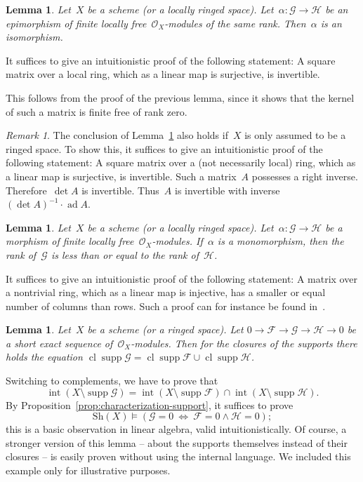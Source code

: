 \documentclass[10pt,reqno,a4paper]{amsbook}
\makeatletter
\theoremstyle{definition}
\theoremstyle{plain}
\newtheorem{lemma}[defn]{Lemma}
\theoremstyle{remark}
\newtheorem{rem}[defn]{Remark}
\newcommand{\F}{\mathcal{F}}
\renewcommand{\G}{\mathcal{G}}
\renewcommand{\H}{\mathcal{H}}
\renewcommand{\O}{\mathcal{O}}
\newcommand{\Sh}{\mathrm{Sh}}
\DeclareMathOperator{\Int}{int}
\DeclareMathOperator{\Clos}{cl}
\DeclareMathOperator{\supp}{supp}
\newcommand{\?}{\,{:}\,}
\renewcommand{\_}{\mathpunct{.}\,}
\renewenvironment{proof}[1][\proofname]{\par
  \pushQED{\qed}%
  \normalfont \topsep6\p@\@plus6\p@\relax
  \trivlist
  \item[\hskip\labelsep
        \itshape
    #1\@addpunct{.}]\ignorespaces
}{%
  \popQED\endtrivlist\@endpefalse
}
\makeatother
\begin{document}
\begin{lemma}\label{lemma:epi-iso}Let~$X$ be a scheme (or a locally ringed space). Let~$\alpha : \G
\to \H$ be an epimorphism of finite locally free~$\O_X$-modules of the same
rank. Then~$\alpha$ is an isomorphism.\end{lemma}
\begin{proof}It suffices to give an intuitionistic proof of the following
statement: A square matrix over a local ring, which as a linear map is
surjective, is invertible.

This follows from the proof of the previous lemma, since it shows that the
kernel of such a matrix is finite free of rank zero.
\end{proof}

\begin{rem}The conclusion of Lemma~\ref{lemma:epi-iso} also holds if~$X$ is
only assumed to be a ringed space. To show this, it suffices to give an
intuitionistic proof of the following statement: A square matrix over a (not
necessarily local) ring, which as a linear map is surjective, is invertible.
Such a matrix~$A$ possesses a right inverse. Therefore~$\det A$ is invertible.
Thus~$A$ is invertible with inverse~$(\det A)^{-1} \cdot \operatorname{ad} A$.
\end{rem}

\begin{lemma}\label{lemma:mono-iso}Let~$X$ be a scheme (or a locally ringed space).
Let~$\alpha : \G \to \H$ be a morphism of finite locally
free~$\O_X$-modules. If~$\alpha$ is a monomorphism, then the rank of~$\G$ is
less than or equal to the rank of~$\H$.\end{lemma}

\begin{proof}It suffices to give an intuitionistic proof of the following
statement: A matrix over a nontrivial ring, which as a linear map is injective,
has a smaller or equal number of columns than rows. Such a proof can for instance be found
in~\cite[p.~1013]{richman:trivial-rings}.
\end{proof}

\begin{lemma}Let~$X$ be a scheme (or a ringed space). Let
$0 \to \F \to \G \to \H \to 0$ be a short exact sequence of~$\O_X$-modules.
Then for the closures of the supports there holds the equation
$\Clos \supp \G = \Clos \supp \F \cup \Clos \supp \H$.
\end{lemma}
\begin{proof}Switching to complements, we have to prove that
\[ \Int(X \setminus \supp\G) = \Int(X \setminus \supp\F) \cap \Int(X \setminus
\supp\H). \]
By Proposition~\ref{prop:characterization-support}, it suffices to prove
\[ \Sh(X) \models (\G = 0\ \Longleftrightarrow\ \F = 0 \wedge \H = 0); \]
this is a basic observation in linear algebra, valid intuitionistically.
\end{proof}
Of course, a stronger version of this lemma -- about the supports themselves
instead of their closures -- is easily proven without using the internal
language. We included this example only for illustrative purposes.
\end{document}
